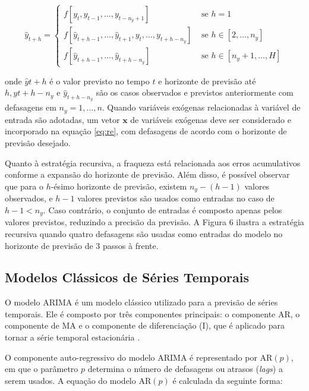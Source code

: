\begin{equation}
	\hat{y}_{t+h}= \begin{cases}f\left[y_t, y_{t-1}, \ldots, y_{t-n_y+1}\right] & \text { se } h=1 \\ f\left[\hat{y}_{t+h-1}, \ldots, \hat{y}_{t+1}, y_t, \ldots, y_{t+h-n_y}\right] & \text { se } h \in\left[2, \ldots, n_y\right] \\ f\left[\hat{y}_{t+h-1}, \ldots, \hat{y}_{t+h-n_y}\right] & \text { se } h \in\left[n_y+1, \ldots, H\right]\end{cases} \label{eq:re}
\end{equation}

\noindent onde $\hat{y}{t+h}$ é o valor previsto no tempo $t$ e horizonte de previsão até $h, y{t+h-n_y}$ e $\hat{y}_{t+h-n_y}$ são os casos observados e previstos anteriormente com defasagens em $n_y=1, \ldots, n$. Quando variáveis exógenas relacionadas à variável de entrada são adotadas, um vetor $\boldsymbol{x}$ de variáveis exógenas deve ser considerado e incorporado na equação \eqref{eq:re}, com defasagens de acordo com o horizonte de previsão desejado.

Quanto à estratégia recursiva, a fraqueza está relacionada aos erros acumulativos conforme a expansão do horizonte de previsão. Além disso, é possível observar que para o $h$-ésimo horizonte de previsão, existem $n_y-(h-1)$ valores observados, e $h-1$ valores previstos são usados como entradas no caso de $h-1<n_y$. Caso contrário, o conjunto de entradas é composto apenas pelos valores previstos, reduzindo a precisão da previsão. A Figura 6 ilustra a estratégia recursiva quando quatro defasagens são usadas como entradas do modelo no horizonte de previsão de 3 passos à frente.



 
 \subsection{Modelos Cl\'assicos de S\'eries Temporais}\label{subsec:arima}

O modelo ARIMA é um modelo clássico utilizado para a previsão de séries temporais. Ele é composto por três componentes principais: o componente AR, o componente de MA e o componente de diferenciação (I), que é aplicado para tornar a série temporal estacionária \cite{prabhakaran2018arima}. 

O componente auto-regressivo do modelo ARIMA é representado por AR$(p)$, em que o parâmetro $p$ determina o número de defasagens ou atrasos (\textit{lags}) a serem usados. A equação do modelo AR$(p)$ é calculada da seguinte forma:
 
